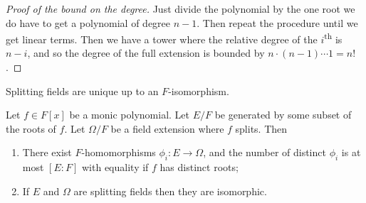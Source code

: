 \begin{proof}[Proof of the bound on the degree]
Just divide the polynomial by the one root we do have to get a polynomial of degree $n-1$. Then repeat the procedure until we get linear terms. Then we have a tower where the relative degree of the $i$\textsuperscript{th} is $n-i$, and so the degree of the full extension is bounded by $n \cdot (n-1) \cdots 1 = n!$.
\end{proof}

\begin{theorem}
Splitting fields are unique up to an $F$-isomorphism.
\end{theorem}

\begin{theorem}
Let $f \in F[x]$ be a monic polynomial. Let $E/F$ be generated by some subset of the roots of $f$. Let $\Omega/F$ be a field extension where $f$ splits. Then 
\begin{enumerate}[label={\textup{(\alph*)}}]
\item There exist $F$-homomorphisms $\phi_i : E \to \Omega$, and the number of distinct $\phi_i$ is at most $[E : F]$ with equality if $f$ has distinct roots;
\item If $E$ and $\Omega$ are splitting fields then they are isomorphic.
\end{enumerate}
\end{theorem}